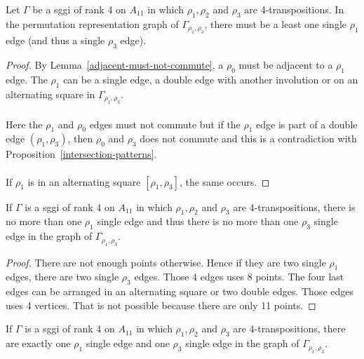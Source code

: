 \begin{lemma}
  Let $\Gamma$ be a sggi of rank 4 on $A_{11}$ in which $\rho_1, \rho_2$ and $\rho_3$ are 4-transpositions. In the permutation representation graph of $\Gamma_{\rho_1, \rho_3}$, there must be a least one single $\rho_1$ edge (and thus a single $\rho_3$ edge).
\end{lemma}

\begin{proof}
  By Lemma~\ref{adjacent-must-not-commute}, a $\rho_0$ must be adjacent to a $\rho_1$ edge. The $\rho_1$ can be a single edge, a double edge with another involution or on an alternating square in $\Gamma_{\rho_1, \rho_3}$.

  \paragraph{}
  Here the $\rho_1$ and $\rho_0$ edges must not commute but if the $\rho_1$ edge is part of a double edge $(\rho_1, \rho_3)$, then $\rho_0$ and $\rho_3$ does not commute and this is a contradiction with Proposition~\ref{intersection-patterns}.

  \paragraph{}
  If $\rho_1$ is in an alternating square $[\rho_1, \rho_3]$, the same occurs.

\end{proof}

\begin{lemma}
    If $\Gamma$ is a sggi of rank 4 on $A_{11}$ in which $\rho_1, \rho_2$ and $\rho_3$ are 4-transpositions, there is no more than one $\rho_1$ single edge and thus there is no more than one $\rho_3$ single edge in the graph of $\Gamma_{\rho_1, \rho_3}$.
\end{lemma}

\begin{proof}
  There are not enough points otherwise. Hence if they are two single $\rho_1$ edges, there are two single $\rho_3$ edges. Those 4 edges uses 8 points. The four last edges can be arranged in an alternating square or two double edges. Those edges uses 4 vertices. That is not possible because there are only 11 points.
\end{proof}

\begin{corollary}
  \label{rank-4-single-1}
    If $\Gamma$ is a sggi of rank 4 on $A_{11}$ in which $\rho_1, \rho_2$ and $\rho_3$ are 4-transpositions, there are exactly one $\rho_1$ single edge and one $\rho_3$ single edge in the graph of $\Gamma_{\rho_1, \rho_3}$.
\end{corollary}

